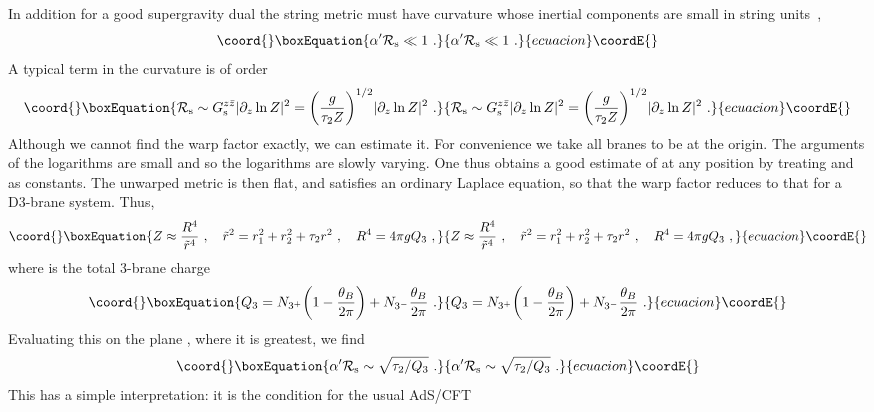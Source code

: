 \documentclass[a4paper,12pt]{article}
\renewcommand{\=}[1]{\bar{#1}}
\begin{document}
In addition for a good supergravity dual the string metric must have curvature whose
inertial components are small in string units~\cite{imsy},
\begin{equation}\coord{}\boxEquation{
\alpha'{\cal R}_{\rm s} \ll 1\ .
}{
\alpha'{\cal R}_{\rm s} \ll 1\ .
}{ecuacion}\coordE{}\end{equation}
A typical term in the curvature is of order
\begin{equation}\coord{}\boxEquation{ 
{\cal R}_{\rm s} \sim G_{\rm s}^{z\bar z} |\partial_z \ln Z|^2
= \biggl( \frac{g}{\tau_2 Z} \biggr)^{1/2} |\partial_z \ln Z|^2 \ .
\label{cond1}
}{ 
{\cal R}_{\rm s} \sim G_{\rm s}^{z\bar z} |\partial_z \ln Z|^2
= \biggl( \frac{g}{\tau_2 Z} \biggr)^{1/2} |\partial_z \ln Z|^2 \ .
}{ecuacion}\coordE{}\end{equation}
Although we cannot find the warp factor \coordHE{} exactly, we can estimate it.  For
convenience we take all branes to be at the origin.  The arguments of the logarithms
are small and so the logarithms are slowly varying. One thus obtains a good
estimate of \coordHE{} at any position by treating \myHighlight{$\tau$}\coordHE{} and
\myHighlight{$\theta$}\coordHE{} as constants.  The unwarped metric is then flat, and \coordHE{} satisfies an
ordinary Laplace equation, so that the warp factor reduces to that for a D3-brane
system.  Thus,
\begin{equation}\coord{}\boxEquation{
Z\approx \frac{R^4}{ \tilde{r}^4} \ ,\quad
\tilde{r}^2={r_1^2+r_2^2} + {\tau_2} r^2\ ,
\quad R^4=4\pi g Q_3 \ , 
\label{Zapprox}
}{
Z\approx \frac{R^4}{ \tilde{r}^4} \ ,\quad
\tilde{r}^2={r_1^2+r_2^2} + {\tau_2} r^2\ ,
\quad R^4=4\pi g Q_3 \ , 
}{ecuacion}\coordE{}\end{equation}
where \coordHE{} is the total 3-brane charge
\begin{equation}\coord{}\boxEquation{
Q_3=N_{3^+}\biggl(1-\frac{\theta_B}{2\pi}\biggr)+N_{3^-}\frac{\theta_B}{2\pi} \ .
}{
Q_3=N_{3^+}\biggl(1-\frac{\theta_B}{2\pi}\biggr)+N_{3^-}\frac{\theta_B}{2\pi} \ .
}{ecuacion}\coordE{}\end{equation}
Evaluating this on the plane \coordHE{}, where it is greatest, we find
\begin{equation}\coord{}\boxEquation{
\alpha'{\cal R}_{\rm s} \sim \sqrt{\tau_2/Q_3}\ .
}{
\alpha'{\cal R}_{\rm s} \sim \sqrt{\tau_2/Q_3}\ .
}{ecuacion}\coordE{}\end{equation}
This has a simple interpretation: it is the condition for the usual AdS/CFT
\end{document}
